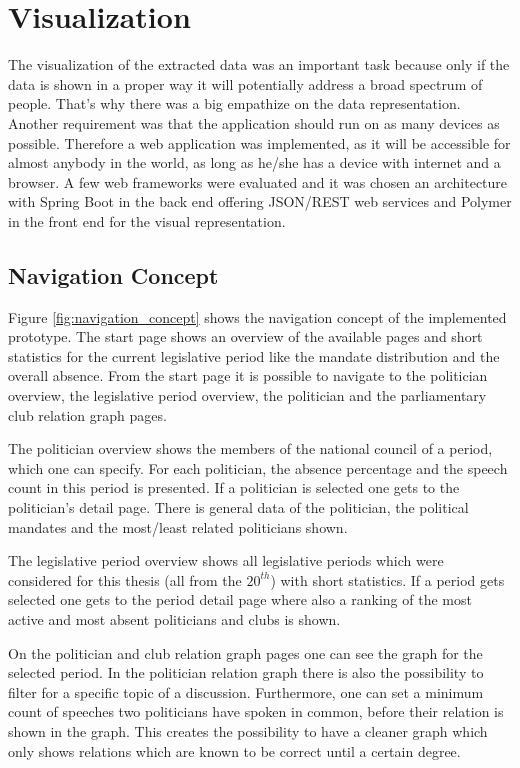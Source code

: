 \section{Visualization}
\label{sec:visualization}
The visualization of the extracted data was an important task because only if the data is shown in a proper way it will potentially address a broad spectrum of people. That's why there was a big empathize on the data representation. Another requirement was that the application should run on as many devices as possible. Therefore a web application was implemented, as it will be accessible for almost anybody in the world, as long as he/she has a device with internet and a browser. A few web frameworks were evaluated and it was chosen an architecture with Spring Boot in the back end offering JSON/REST web services and Polymer in the front end for the visual representation.


\subsection{Navigation Concept}
Figure \ref{fig:navigation_concept} shows the navigation concept of the implemented prototype. The start page shows an overview of the available pages and short statistics for the current legislative period like the mandate distribution and the overall absence. From the start page it is possible to navigate to the politician overview, the legislative period overview, the politician and the parliamentary club relation graph pages. 

The politician overview shows the members of the national council of a period, which one can specify. For each politician, the absence percentage and the speech count in this period is presented. If a politician is selected one gets to the politician's detail page. There is general data of the politician, the political mandates and the most/least related politicians shown.

The legislative period overview shows all legislative periods which were considered for this thesis (all from the $20^{th}$) with short statistics. If a period gets selected one gets to the period detail page where also a ranking of the most active and most absent politicians and clubs is shown.

On the politician and club relation graph pages one can see the graph for the selected period. In the politician relation graph there is also the possibility to filter for a specific topic of a discussion. Furthermore, one can set a minimum count of speeches two politicians have spoken in common, before their relation is shown in the graph. This creates the possibility to have a cleaner graph which only shows relations which are known to be correct until a certain degree.

